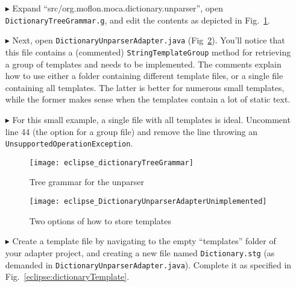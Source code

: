 \begin{itemize}

\item[$\blacktriangleright$] Expand ``src/org.moflon.moca.dictionary.unparser'', open \texttt{Dict\-ion\-ary\-Tree\-Gram\-mar.g}, and edit the contents as
depicted in Fig.~\ref{eclipse:treeGrammar}. 

\vspace{0.5cm}

\item[$\blacktriangleright$] Next, open \texttt{Dict\-ion\-ary\-Un\-pars\-er\-Ad\-ap\-ter.java} (Fig~\ref{eclipse:unparserCommented}). You'll notice that this
file contains a (commented) \texttt{StringTemplateGroup} meth\-od for retrieving a group of templates and needs to be implemented. The comments explain how to
use either a folder containing different template files, or a single file containing all templates. The latter is better for numerous small templates, while the
former makes sense when the templates contain a lot of static text.

\vspace{0.5cm}

\item[$\blacktriangleright$] For this small example, a single file with all templates is ideal. Uncomment line 44 (the option for a group file) and remove
the line throwing an \texttt{Un\-sup\-port\-ed\-Op\-er\-at\-ion\-Ex\-cep\-tion}.

\newpage 

\vspace*{2cm}

\begin{figure}[htpb]
\begin{center}
  \texttt{[image: eclipse\_dictionaryTreeGrammar]}
  \caption{Tree grammar for the unparser}
  \label{eclipse:treeGrammar}
\end{center}
\end{figure}

\vspace{1cm}

\begin{figure}[htpb]
\hspace{-1cm}
  \texttt{[image: eclipse\_DictionaryUnparserAdapterUnimplemented]}
  \caption{Two options of how to store templates}
  \label{eclipse:unparserCommented}
\end{figure}

\newpage


\item[$\blacktriangleright$] Create a template file by navigating to the empty ``templates'' folder of your adapter project, and creating a new file
named \texttt{Dictionary.stg} (as demanded in \texttt{Dict\-ion\-ary\-Un\-pars\-er\-Ad\-ap\-ter.java}). Complete it as specified in
Fig.~\ref{eclipse:dictionaryTemplate}.


\end{itemize}
